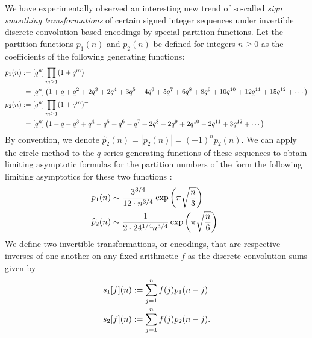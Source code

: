 \documentclass[11pt,reqno]{amsart}
\numberwithin{figure}{section}
\numberwithin{table}{section}
\theoremstyle{plain}
\numberwithin{theorem}{section}
\theoremstyle{definition}
\begin{document}
We have experimentally observed an interesting new trend of so-called 
\emph{sign smoothing transformations} of certain signed integer sequences under invertible 
discrete convolution based encodings by special partition functions. 
Let the partition functions $p_1(n)$ and $p_2(n)$ be defined for integers $n \geq 0$ 
as the coefficients of the following generating functions: 
\begin{align} 
p_1(n) & := [q^n] \prod_{m \geq 1} (1+q^m) \\ 
\notag 
       & \phantom{:} = [q^n]\left(1+q+q^2+2q^3+2q^4+3q^5+4q^6+5q^7+6q^8+8q^9+10q^{10}+ 
       12q^{11}+15q^{12}+\cdots\right) \\ 
\notag 
p_2(n) & := [q^n] \prod_{m \geq 1} (1+q^m)^{-1} \\ 
\notag 
       & \phantom{:} = [q^n]\left(1-q-q^3+q^4-q^5+q^6-q^7+2q^8-2q^9 + 
       2q^{10}-2q^{11}+3q^{12} + \cdots \right)
\end{align} 
By convention, we denote $\widehat{p}_2(n) = |p_2(n)| = (-1)^n p_2(n)$. We can apply the 
circle method to the $q$-series generating functions of these sequences to obtain 
limiting asymptotic formulas for the partition numbers of the form 
the following limiting asymptotics for these two functions \cite{ANALYTIC-COMB}: 
\begin{align} 
\label{eqn_PFuncsP1P2n_asymptotics_stmt_v1} 
p_1(n) & \sim \frac{3^{3/4}}{12 \cdot n^{3/4}} \exp\left(\pi\sqrt{\frac{n}{3}}\right) \\ 
\notag
\widehat{p}_2(n) & \sim \frac{1}{2 \cdot 24^{1/4} n^{3/4}} \exp\left(\pi\sqrt{\frac{n}{6}}\right). 
\end{align} 
We define two invertible transformations, or encodings, that are respective inverses of one another 
on any fixed arithmetic $f$ as the discrete 
convolution sums given by 
\begin{align} 
\label{eqn_TfEncodingsSpecialCasePFunc_examples_v1} 
s_1[f](n) & := \sum_{j=1}^{n} f(j) p_1(n-j) \\ 
\notag 
s_2[f](n) & := \sum_{j=1}^{n} f(j) p_2(n-j). 
\end{align} 
\end{document}
